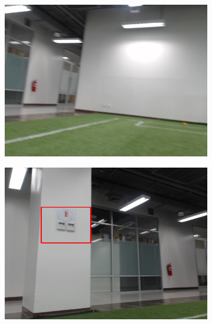 	\begin{figure}[H]
		\centering
		\begin{subfigure}{.2\textwidth}
			\centering
			\includegraphics[width=\textwidth]{image/landmark/landmark1.png}
		\end{subfigure}
		\begin{subfigure}{.2\textwidth}
			\centering
			\includegraphics[width=\textwidth]{image/landmark/landmark3.png}
		\end{subfigure}
		\begin{subfigure}{.2\textwidth}
			\centering

\end{subfigure}
\end{figure}
